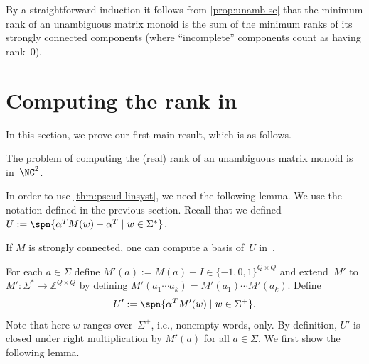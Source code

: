 \noindent
By a straightforward induction it follows from \autoref{prop:unamb-sc} that the minimum rank of an unambiguous matrix monoid is the sum of the minimum ranks of its strongly connected components (where ``incomplete'' components count as having rank~$0$).



\section{Computing the rank in \texorpdfstring{\NCT}{NC2}}\label{sec-nc2}
In this section, we prove our first main result, which is as follows.

\begin{thm} \label{thm:rank-in-NC}
The problem of computing the (real) rank of an unambiguous matrix monoid is in~$\NC^2$.
\end{thm}

\noindent
In order to use \autoref{thm:pseud-linsyst}, we need the following lemma. We use the notation defined in the previous section.
Recall that we defined $U := \spn{\alpha^T M(w) - \alpha^T \mid w \in \Sigma^*}$.

\begin{lem} \label{lem:U-in-NC}
If $M$ is strongly connected,
one can compute a basis of~$U$ in~\NCT.
\end{lem}

\noindent
For each $a \in \Sigma$ define $M'(a) := M(a) - I \in \{-1,0,1\}^{Q \times Q}$ and extend~$M'$ to $M' : \Sigma^* \to \mathbb{Z}^{Q \times Q}$ by defining $M'(a_1 \cdots a_k) = M'(a_1) \cdots M'(a_k)$.
Define \[U' := \spn{\alpha^T M'(w) \mid w \in \Sigma^+}.\]
Note that here $w$ ranges over~$\Sigma^+$, i.e., nonempty words, only. By definition, $U'$ is closed under right multiplication by $M'(a)$ for all $a \in \Sigma$.
We first show the following lemma.

